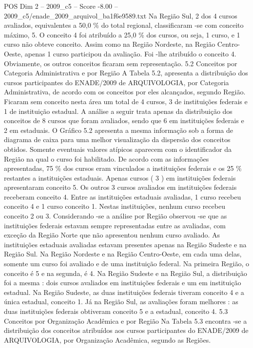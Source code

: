 \begin{textsample}{POS Dim 2 – 2009\_c5 – Score -8.00 – 2009\_c5/enade\_2009\_arquivol\_ba1f6e9589.txt}
Na Região Sul, 2 dos 4 cursos avaliados, equivalentes a 50,0 \% do total regional, classificaram -se com conceito máximo, 5.
O conceito 4 foi atribuído a 25,0 \% dos cursos, ou seja, 1 curso, e 1 curso não obteve conceito.
Assim como na Região Nordeste, na Região Centro-Oeste, apenas 1 curso participou da avaliação.
Foi -lhe atribuído o conceito 4.
Obviamente, os outros conceitos ficaram sem representação. 5.2 Conceitos por Categoria Administrativa e por Região A Tabela 5.2, apresenta a distribuição dos cursos participantes do ENADE/2009 de ARQUIVOLOGIA, por Categoria Administrativa, de acordo com os conceitos por eles alcançados, segundo Região.
Ficaram sem conceito nesta área um total de 4 cursos, 3 de instituições federais e 1 de instituição estadual.
A análise a seguir trata apenas da distribuição dos conceitos de 8 cursos que foram avaliados, sendo que 6 em instituições federais e 2 em estaduais.
O Gráfico 5.2 apresenta a mesma informação sob a forma de diagrama de caixa para uma melhor visualização da dispersão dos conceitos obtidos.
Somente eventuais valores atípicos aparecem com o identificador da Região na qual o curso foi habilitado.
De acordo com as informações apresentadas, 75 \% dos cursos eram vinculados a instituições federais e os 25 \% restantes a instituições estaduais.
Apenas cursos ( 3 ) em instituições federais apresentaram conceito 5.
Os outros 3 cursos avaliados em instituições federais receberam conceito 4.
Entre as instituições estaduais avaliadas, 1 curso recebeu conceito 4 e 1 curso conceito 1.
Nestas instituições, nenhum curso recebeu conceito 2 ou 3.
Considerando -se a análise por Região observou -se que as instituições federais estavam sempre representadas entre as avaliadas, com exceção da Região Norte que não apresentou nenhum curso avaliado.
As instituições estaduais avaliadas estavam presentes apenas na Região Sudeste e na Região Sul.
Na Região Nordeste e na Região Centro-Oeste, em cada uma delas, somente um curso foi avaliado e de uma instituição federal.
Na primeira Região, o conceito é 5 e na segunda, é 4.
Na Região Sudeste e na Região Sul, a distribuição foi a mesma : dois cursos avaliados em instituições federais e um em instituição estadual.
Na Região Sudeste, as duas instituições federais tiveram conceito 4 e a única estadual, conceito 1.
Já na Região Sul, as avaliações foram melhores : as duas instituições federais obtiveram conceito 5 e a estadual, conceito 4. 5.3 Conceitos por Organização Acadêmica e por Região Na Tabela 5.3 encontra -se a distribuição dos conceitos atribuídos aos cursos participantes do ENADE/2009 de ARQUIVOLOGIA, por Organização Acadêmica, segundo as Regiões.

\end{textsample}
